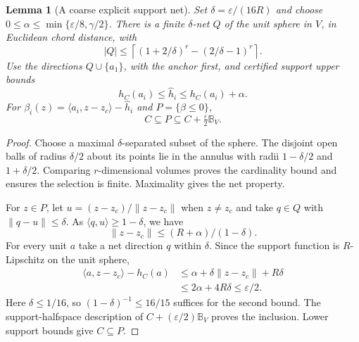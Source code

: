 \documentclass[journal,10pt]{IEEEtran}
\newtheorem{lemma}{Lemma}
\theoremstyle{definition}\newtheorem{definition}{Definition}
\theoremstyle{remark}
\newcommand{\ball}{\mathbb B_V}
\begin{document}
\begin{lemma}[A coarse explicit support net]\label{lem:net}
Set $\delta=\varepsilon/(16R)$ and choose
$0\leq\alpha\leq\min\{\varepsilon/8,\gamma/2\}$.
There is a finite $\delta$-net $Q$ of the unit sphere in $V$, in Euclidean chord distance, with
\[
 |Q|\leq\left\lceil(1+2/\delta)^r-(2/\delta-1)^r\right\rceil.
\]
Use the directions $Q\cup\{a_1\}$, with the anchor first, and certified support upper bounds
\[
 h_C(a_i)\leq\widehat h_i\leq h_C(a_i)+\alpha.
\]
For $\beta_i(z)=\langle a_i,z-z_c\rangle-\widehat h_i$ and $P=\{\beta\leq0\}$,
\[
 C\subseteq P\subseteq C+\tfrac{\varepsilon}{2}\ball.
\]
\end{lemma}
\begin{proof}
Choose a maximal $\delta$-separated subset of the sphere. The disjoint open balls of radius $\delta/2$ about its points lie in the annulus with radii $1-\delta/2$ and $1+\delta/2$. Comparing $r$-dimensional volumes proves the cardinality bound and ensures the selection is finite. Maximality gives the net property.

For $z\in P$, let $u=(z-z_c)/\|z-z_c\|$ when $z\neq z_c$ and take $q\in Q$ with $\|q-u\|\leq\delta$. As $\langle q,u\rangle\geq1-\delta$, we have
\[
 \|z-z_c\|\leq (R+\alpha)/(1-\delta).
\]
For every unit $a$ take a net direction $q$ within $\delta$. Since the support function is $R$-Lipschitz on the unit sphere,
\begin{align*}
 \langle a,z-z_c\rangle-h_C(a)
 &\leq\alpha+\delta\|z-z_c\|+R\delta\\
 &\leq 2\alpha+4R\delta\leq\varepsilon/2.
\end{align*}
Here $\delta\leq1/16$, so $(1-\delta)^{-1}\leq16/15$ suffices for the second bound. The support-halfspace description of $C+(\varepsilon/2)\ball$ proves the inclusion. Lower support bounds give $C\subseteq P$.
\end{proof}
\end{document}
